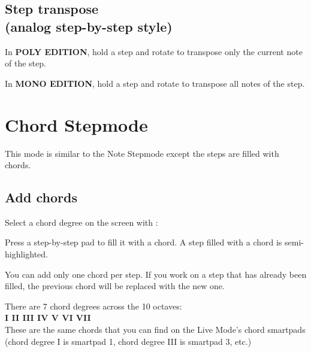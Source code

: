 
\subsection{Step transpose\\(analog step-by-step style)}

In \textbf{POLY EDITION}, hold a step \padsicon{} and rotate \encodericon{} to transpose only the current note of the step.


In \textbf{MONO EDITION}, hold a step \padsicon{} and rotate \encodericon{} to transpose all notes of the step.




\section{Chord Stepmode}

This mode is similar to the Note Stepmode except the steps are filled with chords.

\subsection{Add chords}

Select a chord degree on the screen with \encodericon{}:



Press a step-by-step pad \padsicon{} to fill it with a chord. A step filled with a chord is semi-highlighted.


You can add only one chord per step. If you work on a step that has already been filled, the previous chord will be replaced with the new one.

There are 7 chord degrees across the 10 octaves:\\
\textbf{I  II  III  IV  V  VI  VII}\\
These are the same chords that you can find on the Live Mode's chord smartpads (chord degree I is smartpad 1, chord degree III is smartpad 3, etc.)

